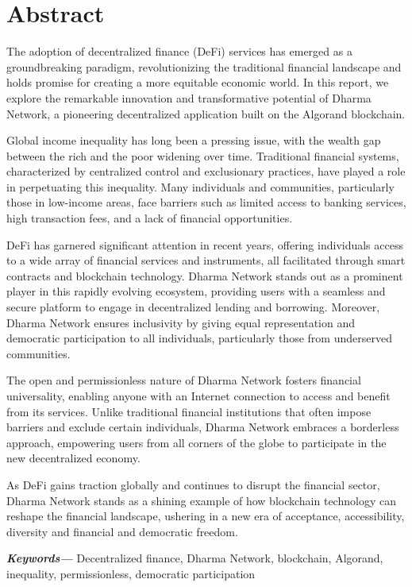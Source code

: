 \chapter*{Abstract}

\providecommand{\keywords}[1]
{
  \small	
  \textbf{\textit{Keywords---}} #1
}


The adoption of decentralized finance (DeFi) services has emerged as a groundbreaking paradigm, revolutionizing the traditional financial landscape and holds promise for creating a more equitable economic world. In this report, we explore the remarkable innovation and transformative potential of Dharma Network, a pioneering decentralized application built on the Algorand blockchain.\newline

Global income inequality has long been a pressing issue, with the wealth gap between the rich and the poor widening over time. Traditional financial systems, characterized by centralized control and exclusionary practices, have played a role in perpetuating this inequality. Many individuals and communities, particularly those in low-income areas, face barriers such as limited access to banking services, high transaction fees, and a lack of financial opportunities.\newline

DeFi has garnered significant attention in recent years, offering individuals access to a wide array of financial services and instruments, all facilitated through smart contracts and blockchain technology. Dharma Network stands out as a prominent player in this rapidly evolving ecosystem, providing users with a seamless and secure platform to engage in decentralized lending and borrowing. Moreover, Dharma Network ensures inclusivity by giving equal representation and democratic participation to all individuals, particularly those from underserved communities.\newline

The open and permissionless nature of Dharma Network fosters financial universality, enabling anyone with an Internet connection to access and benefit from its services. Unlike traditional financial institutions that often impose barriers and exclude certain individuals, Dharma Network embraces a borderless approach, empowering users from all corners of the globe to participate in the new decentralized economy.\newline

As DeFi gains traction globally and continues to disrupt the financial sector, Dharma Network stands as a shining example of how blockchain technology can reshape the financial landscape, ushering in a new era of acceptance, accessibility, diversity and financial and democratic freedom.


\vspace*{2cm}

\keywords{Decentralized finance, Dharma Network, blockchain, Algorand, inequality, permissionless, democratic participation} 



